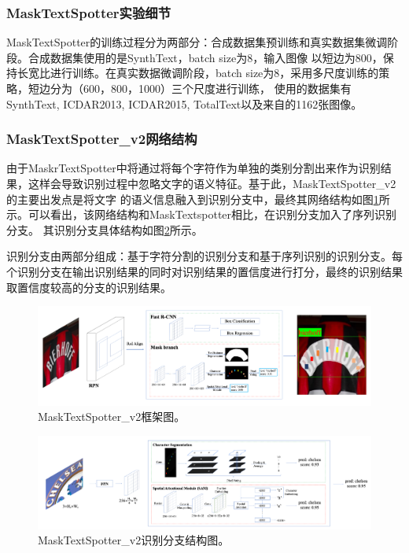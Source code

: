 \subsubsection{MaskTextSpotter实验细节}
MaskTextSpotter的训练过程分为两部分：合成数据集预训练和真实数据集微调阶段。合成数据集使用的是SynthText\cite{gupta2016synthetic}，batch size为8，输入图像
以短边为800，保持长宽比进行训练。在真实数据微调阶段，batch size为8，采用多尺度训练的策略，短边分为（600，800，1000）三个尺度进行训练，
使用的数据集有SynthText, ICDAR2013, ICDAR2015, TotalText以及来自\cite{zhong2016deeptext}的1162张图像。

\subsubsection{MaskTextSpotter\_v2网络结构}
由于MaskrTextSpotter中将通过将每个字符作为单独的类别分割出来作为识别结果，这样会导致识别过程中忽略文字的语义特征。基于此，MaskTextSpotter\_v2的主要出发点是将文字
的语义信息融入到识别分支中，最终其网络结构如图\ref{masktextspotter_v2_framework}所示。可以看出，该网络结构和MaskTextspotter相比，在识别分支加入了序列识别分支。
其识别分支具体结构如图\ref{masktextspotter_v2_recog}所示。

识别分支由两部分组成：基于字符分割的识别分支和基于序列识别的识别分支。每个识别分支在输出识别结果的同时对识别结果的置信度进行打分，最终的识别结果取置信度较高的分支的识别结果。
\begin{figure}[htb]
    \centering
    \includegraphics[width=.98\textwidth]{figure/spotting/masktextspotter_v2_framework.png} 
    \caption{MaskTextSpotter\_v2框架图。} 
    \label{masktextspotter_v2_framework} 
\end{figure}

\begin{figure}[htb]
    \centering
    \includegraphics[width=.98\textwidth]{figure/spotting/masktextspotter_v2_recog.png} 
    \caption{MaskTextSpotter\_v2识别分支结构图。} 
    \label{masktextspotter_v2_recog} 
\end{figure}

